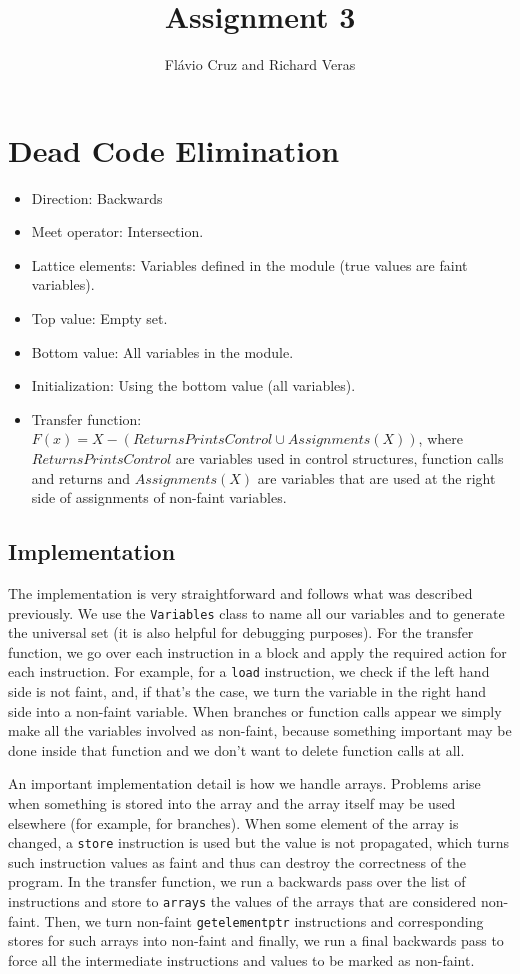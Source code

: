 \documentclass[12pt]{article}
\author{Fl\'{a}vio Cruz and Richard Veras}
\title{Assignment 3}
\begin{document}
\maketitle

\section{Dead Code Elimination}

\begin{itemize}
   \item Direction: Backwards
   \item Meet operator: Intersection.
   \item Lattice elements: Variables defined in the module (true values are faint variables).
   \item Top value: Empty set.
   \item Bottom value: All variables in the module.
   \item Initialization: Using the bottom value (all variables).
   \item Transfer function: $F(x) = X - (ReturnsPrintsControl \cup Assignments(X))$, where $ReturnsPrintsControl$ are variables used in control structures, function calls and returns and $Assignments(X)$ are variables that are used at the right side of assignments of non-faint variables.
\end{itemize}

\subsection{Implementation}

The implementation is very straightforward and follows what was described previously.
We use the \texttt{Variables} class to name all our variables and to generate the universal set (it is also helpful for debugging purposes). For the transfer function, we go over each instruction in a block and apply the required action for each instruction.
For example, for a \texttt{load} instruction, we check if the left hand side is not faint, and, if that's the case, we turn the variable in the right hand side into a non-faint variable. When branches or function calls appear we simply make all the variables involved as non-faint, because something important may be done inside that function and we don't want to delete function calls at all.

An important implementation detail is how we handle arrays. Problems arise when something is stored into the array and the array itself may be used elsewhere (for example, for branches). When some element of the array is changed, a \texttt{store} instruction is used but the value is not propagated, which turns such instruction values as faint and thus can destroy the correctness of the program. In the transfer function, we run a backwards pass over the list of instructions and store to \texttt{arrays} the values of the arrays that are considered non-faint. Then, we turn non-faint \texttt{getelementptr} instructions and corresponding
stores for such arrays into non-faint and finally, we run a final backwards pass to force all the intermediate instructions and values to be marked as non-faint.
\end{document}
